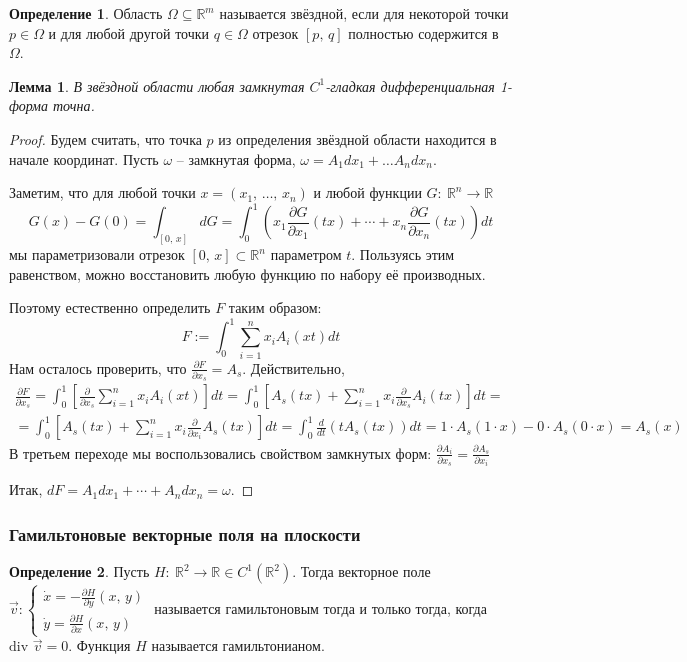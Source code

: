 \documentclass[a4paper,12pt]{article}
\theoremstyle{plain}
\newtheorem{lemma}{Лемма}[section]
\theoremstyle{definition}
\newtheorem{definition}{Определение}[section]
\theoremstyle{remark}
\begin{document}
\begin{definition}
	Область $\Omega \subseteq \mathbb{R}^m$ называется звёздной, если для некоторой точки $p \in \Omega$ и для любой другой точки $q \in \Omega$ отрезок $[p,\, q]$ полностью содержится в $\Omega$.
\end{definition}

\begin{lemma}
	В звёздной области любая замкнутая $C^1$-гладкая дифференциальная 1-форма точна.
\end{lemma}

\begin{proof}
	Будем считать, что точка $p$ из определения звёздной области находится в начале координат. Пусть $\omega$ -- замкнутая форма, $\omega = A_1dx_1 + \ldots A_ndx_n$.

	Заметим, что для любой точки $x = (x_1,\,\ldots,\,x_n)$ и любой функции $G:\: \mathbb{R}^n \to \mathbb{R}$
	\[G(x) - G(0) = \int_{[0,\,x]}dG = \int_0^1\left(x_1\frac{\partial G}{\partial x_1}(tx) + \cdots + x_n\frac{\partial G}{\partial x_n}(tx)\right)dt\]
	мы параметризовали отрезок $[0,\,x] \subset \mathbb{R}^n$ параметром $t$. Пользуясь этим равенством, можно восстановить любую функцию по набору её производных.

	Поэтому естественно определить $F$ таким образом:
	\[F := \int_0^1 \sum_{i = 1}^n x_iA_i(xt)dt\]
	Нам осталось проверить, что $\frac{\partial F}{\partial x_s} = A_s$. Действительно,
	\begin{align*}
		\frac{\partial F}{\partial x_s} = \int_0^1 \left[\frac{\partial}{\partial x_s} \sum_{i = 1}^n x_iA_i(xt)\right]dt = \int_0^1 \left[A_s(tx) + \sum_{i = 1}^n x_i \frac{\partial}{\partial x_s}A_i(tx)\right]dt = \\
		= \int_0^1 \left[A_s(tx) + \sum_{i = 1}^n x_i \frac{\partial}{\partial x_i}A_s(tx)\right]dt = \int_0^1 \frac{d}{dt}(tA_s(tx))dt = 1\cdot A_s(1 \cdot x) - 0 \cdot A_s(0 \cdot x) = A_s(x)
	\end{align*}
	В третьем переходе мы воспользовались свойством замкнутых форм: $\frac{\partial A_i}{\partial x_s} = \frac{\partial A_s}{\partial x_i}$

	Итак, $dF = A_1dx_1 + \cdots + A_ndx_n = \omega$.
\end{proof}

\subsubsection*{Гамильтоновые векторные поля на плоскости}
\begin{definition}
	Пусть $H:\: \mathbb{R}^2 \to \mathbb{R} \in C^1(\mathbb{R}^2)$. Тогда векторное поле
	$\vec{v}: \begin{cases}
			\dot{x} = -\frac{\partial H}{\partial y}(x,\,y) \\
			\dot{y} = \frac{\partial H}{\partial x}(x,\,y)
		\end{cases}$ называется гамильтоновым тогда и только тогда, когда $\text{div }\vec{v} = 0$. Функция $H$ называется гамильтонианом.
\end{definition}
\end{document}
